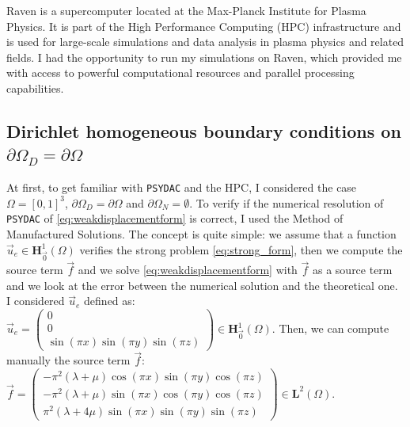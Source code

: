 \documentclass[a4paper,12pt,twoside]{report}
\begin{document}
Raven is a supercomputer located at the Max-Planck Institute for Plasma Physics. It is part of the High Performance Computing (HPC) infrastructure and is used for large-scale simulations and data analysis in plasma physics and related fields. I had the opportunity to run my simulations on Raven, which provided me with access to powerful computational resources and parallel processing capabilities. 


\subsection{Dirichlet homogeneous boundary conditions on $\partial\Omega_D = \partial\Omega$} \label{subsec:Dirichlet Homogeneous Boundary conditions on}

At first, to get familiar with \texttt{PSYDAC} and the HPC, I considered the case $\Omega = [0,1]^3$, $\partial \Omega_D = \partial\Omega$ and $\partial \Omega_N = \emptyset$. To verify if the numerical resolution of \texttt{PSYDAC} of \eqref{eq:weakdisplacementform} is correct, I used the Method of Manufactured Solutions. The concept is quite simple: we assume that a function $\vec u_e \in \boldsymbol H^1_{\vec 0}(\Omega)$ verifies the strong problem \eqref{eq:strong_form}, then we compute the source term $\vec f$ and we solve \eqref{eq:weakdisplacementform} with $\vec f$ as a source term and we look at the error between the numerical solution and the theoretical one.
I considered $\vec u_e$ defined as: $\vec u_e = \begin{pmatrix}
	0 \\
	0 \\
\sin{\left(\pi x \right)} \sin{\left(\pi y \right)} \sin{\left(\pi z \right)}
\end{pmatrix} \in \boldsymbol H^1_{\vec 0}(\Omega).$ Then, we can compute manually the source term $\vec f$: $\vec f = \begin{pmatrix}
	 - \pi^{2} \left(\lambda + \mu\right) \cos{\left(\pi x \right)} \sin{\left(\pi y \right)}  \cos{\left(\pi z \right)} \\
	 - \pi^{2} \left(\lambda + \mu\right) \sin{\left(\pi x \right)} \cos{\left(\pi y \right)} \cos{\left(\pi z \right)} \\
	  \pi^{2} \left(\lambda + 4 \mu\right) \sin{\left(\pi x \right)} \sin{\left(\pi y \right)} \sin{\left(\pi z \right)}
\end{pmatrix} \in \boldsymbol L^2(\Omega).$
\end{document}
